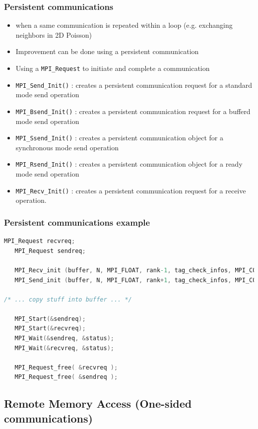 \begin{frame}[containsverbatim]
\frametitle{Persistent communications}
\begin{itemize}
	\item {when a same communication is repeated within a loop (e.g. exchanging neighbors in 2D Poisson) }
	\item {Improvement can be done using a persistent communication}
	\item {Using a \verb+MPI_Request+ to initiate and complete a communication}
	\item {\verb+MPI_Send_Init()+ : creates a persistent communication request for a standard mode send operation }
	\item {\verb+MPI_Bsend_Init()+ : creates a persistent communication request for a bufferd mode send operation}
	\item {\verb+MPI_Ssend_Init()+ : creates a persistent communication object for a synchronous mode send operation}
	\item {\verb+MPI_Rsend_Init()+ : creates a persistent communication object for a ready mode send operation}
	\item {\verb+MPI_Recv_Init()+ : creates a persistent communication request for a receive operation.}
\end{itemize}
\end{frame}


\begin{frame}[containsverbatim]
\frametitle{Persistent communications example}	

\begin{lstlisting}[language=C,frame=lines,basicstyle=\footnotesize]
   MPI_Request recvreq;
   MPI_Request sendreq;

   MPI_Recv_init (buffer, N, MPI_FLOAT, rank-1, tag_check_infos, MPI_COMM_WORLD, &recvreq);
   MPI_Send_init (buffer, N, MPI_FLOAT, rank+1, tag_check_infos, MPI_COMM_WORLD, &sendreq);

/* ... copy stuff into buffer ... */

   MPI_Start(&sendreq);         
   MPI_Start(&recvreq);         
   MPI_Wait(&sendreq, &status); 
   MPI_Wait(&recvreq, &status); 

   MPI_Request_free( &recvreq );
   MPI_Request_free( &sendreq );
\end{lstlisting}
\end{frame}




\subsection{Remote Memory Access (One-sided communications)}

